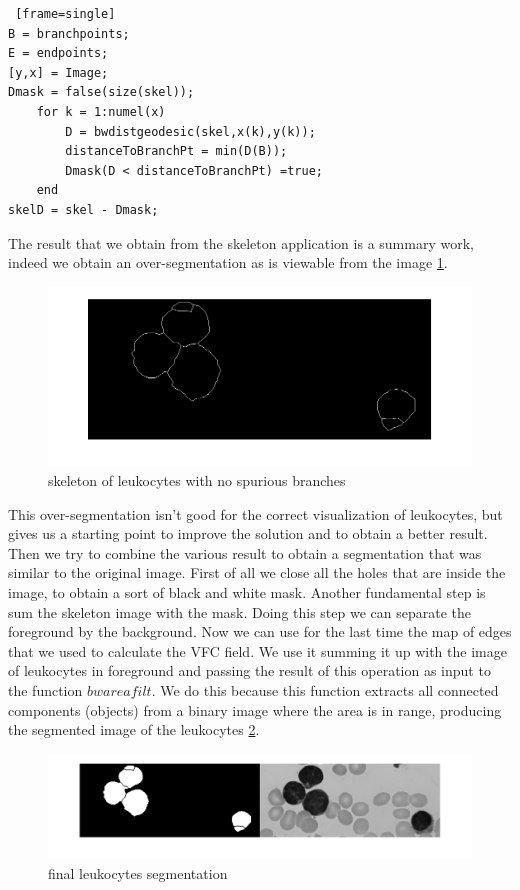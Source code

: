 \begin{minipage}{\linewidth}
\begin{scriptsize}
	\begin{lstlisting} [frame=single]
B = branchpoints;
E = endpoints;
[y,x] = Image;
Dmask = false(size(skel));
	for k = 1:numel(x)
    	D = bwdistgeodesic(skel,x(k),y(k));
    	distanceToBranchPt = min(D(B));
    	Dmask(D < distanceToBranchPt) =true;
	end
skelD = skel - Dmask;
	\end{lstlisting}
\end{scriptsize}
\end{minipage}
The result that we obtain from the skeleton application is a summary work, indeed we obtain an over-segmentation as is viewable from the image \ref{fig:skelfin}.
\begin{figure}
	\begin{center}
		\centering
		\includegraphics[scale=0.5]{img/skelfin.png}
		\caption{skeleton of leukocytes with no spurious branches}
		\label{fig:skelfin}
	\end{center}
\end{figure}
This over-segmentation isn't good for the correct visualization of leukocytes, but gives us a starting point to improve the solution and to obtain a better result.
Then we try to combine the various result to obtain a segmentation that was similar to the original image. First of all we close all the holes that are inside the image, to obtain a sort of black and white mask. Another fundamental step is sum the skeleton image with the mask. Doing this step we can separate the foreground by the background. Now we can use for the last time the map of edges that we used to calculate the VFC field. We use it summing it up with the image of leukocytes in foreground and passing the result of this operation as input to the function $bwareafilt$. We do this because this function extracts all connected components (objects)
from a binary image where the area is in range, producing the segmented image of the leukocytes \ref{fig:bwarea}.
\begin{figure}
	\begin{center}
		\centering
		\includegraphics[scale=0.3]{img/segmentation.png}
		\caption{final leukocytes segmentation }
		\label{fig:bwarea}
	\end{center}
\end{figure}
